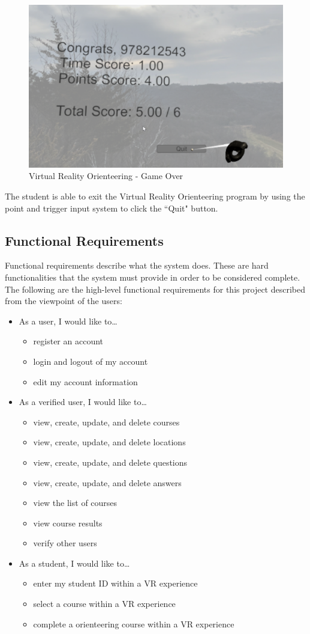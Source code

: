 \begin{figure}[htb]
	\centering
	\includegraphics[width=.6\textwidth]{Requirements/assets/vr-game-over.png}
	\caption[Virtual Reality Orienteering - Game Over]{\label{VR Game Over}Virtual Reality Orienteering - Game Over}
\end{figure} 
The student is able to exit the Virtual Reality Orienteering program by using the point and trigger input system to click the ``Quit" button.
\subsection{Functional Requirements}
Functional requirements describe what the system does. These are hard functionalities that the system must provide in order to be considered complete. The following are the high-level functional requirements for this project described from the viewpoint of the users:
\begin{itemize}
	\item As a user, I would like to\ldots
	\begin{itemize}
		\item register an account
		\item login and logout of my account
		\item edit my account information
	\end{itemize}
	\item As a verified user, I would like to\ldots
	\begin{itemize}
		\item view, create, update, and delete courses
		\item view, create, update, and delete locations
		\item view, create, update, and delete questions
		\item view, create, update, and delete answers
		\item view the list of courses
		\item view course results
		\item verify other users
	\end{itemize}
	\item As a student, I would like to\ldots
	\begin{itemize}
		\item enter my student ID  within a VR experience
		\item select a course within a VR experience
		\item complete a orienteering course within a VR experience
	\end{itemize}
\end{itemize}

